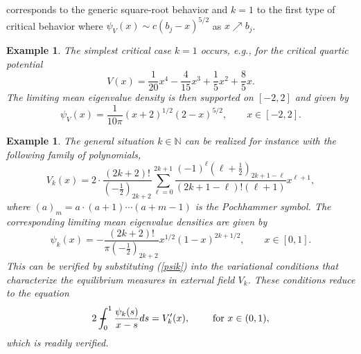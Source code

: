 \documentclass[11pt,fleqn]{article}
\numberwithin{equation}{section}
\newtheorem{Example}[theorem]{Example}
\newenvironment{example}{\begin{Example}\rm}{\end{Example}}
\newcommand\PVint{\mathop{\setbox0\hbox{$\displaystyle\intop$}%
        \hskip0.2\wd0%
        \vcenter{\hrule width0.6\wd0height0.5pt depth0.5pt}%
        \hskip-0.8\wd0%
        }\mskip-\thinmuskip\intop\nolimits}
\begin{document}
corresponds to the generic square-root behavior and $k=1$ to the
first type of critical behavior where $\psi_V(x)\sim c(b_j-x)^{5/2}$
as $x\nearrow b_j$.
\begin{example}
The simplest critical case $k=1$ occurs, e.g., for the critical quartic potential
    \begin{equation}\label{V}
        V(x)=\frac{1}{20}x^4-\frac{4}{15}x^3+\frac{1}{5}x^2+\frac{8}{5}x.
    \end{equation}
    The limiting mean eigenvalue density is then supported on $[-2,2]$ and given by \cite{CIK}
    \begin{equation}
        \psi_V(x) =
        \frac{1}{10\pi}(x+2)^{1/2}(2-x)^{5/2},\qquad\mbox{$x\in [-2,2]$}.
    \end{equation}
\end{example}
\begin{example}
The general situation $k\in\mathbb N$ can be realized for instance with
the following family of polynomials,
\begin{equation}
V_k(x)=2 \cdot \frac{(2k+2)!}{
\left(-\frac{1}{2}\right)_{2k+2}}
\sum_{\ell=0}^{2k+1}\frac{(-1)^\ell(\ell+\frac{1}{2})_{2k+1-\ell}}{(2k+1-\ell)! (\ell+1)}x^{\ell+1},
\end{equation}
where $(a)_m=a\cdot(a+1)\cdots (a+m-1)$ is the Pochhammer symbol.
The corresponding limiting mean eigenvalue densities are given by
\begin{equation}\label{psik}
        \psi_k(x) =
        -\frac{(2k+2)!}{\pi \left(-\frac{1}{2}\right)_{2k+2}}x^{1/2}(1-x)^{2k+1/2},\qquad\mbox{$x\in [0,1]$}.
    \end{equation}
This can be verified by substituting (\ref{psik}) into the
variational conditions that characterize the equilibrium measures
in external field $V_k$. These conditions reduce to the
equation
\[2\PVint_0^1\frac{\psi_k(s)}{x-s}ds=V_k'(x),\qquad\mbox{ for $x\in (0,1)$},\]
which is readily verified.
\end{example}
\end{document}
